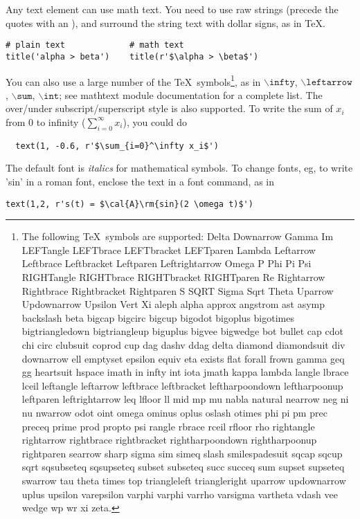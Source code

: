 \documentclass[twoside,10pt]{book}
\begin{document}
Any text element can use math text.  You need to use raw strings
(precede the quotes with an ), and surround the string text
with dollar signs, as in \TeX.
\begin{lstlisting}
# plain text             # math text
title('alpha > beta')    title(r'$\alpha > \beta$')
\end{lstlisting}
You can also use a large number of the \TeX\ symbols\footnote{The following \TeX\ symbols are
supported: {\tiny Delta Downarrow Gamma Im LEFTangle LEFTbrace
  LEFTbracket LEFTparen Lambda Leftarrow Leftbrace Leftbracket
  Leftparen Leftrightarrow Omega P Phi Pi Psi RIGHTangle RIGHTbrace
  RIGHTbracket RIGHTparen Re Rightarrow Rightbrace Rightbracket
  Rightparen S SQRT Sigma Sqrt Theta Uparrow Updownarrow Upsilon Vert
  Xi aleph alpha approx angstrom ast asymp backslash beta bigcap
  bigcirc bigcup bigodot bigoplus bigotimes bigtriangledown
  bigtriangleup biguplus bigvee bigwedge bot bullet cap cdot chi circ
  clubsuit coprod cup dag dashv ddag delta diamond diamondsuit div
  downarrow ell emptyset epsilon equiv eta exists flat forall frown
  gamma geq gg heartsuit hspace imath in infty int iota jmath kappa
  lambda langle lbrace lceil leftangle leftarrow leftbrace leftbracket
  leftharpoondown leftharpoonup leftparen leftrightarrow leq lfloor ll
  mid mp mu nabla natural nearrow neg ni nu nwarrow odot oint omega
  ominus oplus oslash otimes phi pi pm prec preceq prime prod propto
  psi rangle rbrace rceil rfloor rho rightangle rightarrow rightbrace
  rightbracket rightharpoondown rightharpoonup rightparen searrow
  sharp sigma sim simeq slash smilespadesuit sqcap sqcup sqrt
  sqsubseteq sqsupseteq subset subseteq succ succeq sum supset
  supseteq swarrow tau theta times top triangleleft triangleright
  uparrow updownarrow uplus upsilon varepsilon varphi varphi varrho
  varsigma vartheta vdash vee wedge wp wr xi zeta}.}, as in
$\mathtt{\backslash infty}$, $\mathtt{\backslash leftarrow}$,
$\mathtt{\backslash sum}$, $\mathtt{\backslash int}$; see mathtext
module documentation for a complete list.  The over/under
subscript/superscript style is also supported.  To write the sum of
$x_i$ from 0 to infinity ($\sum_{i=0}^\infty x_i$), you could do
\begin{lstlisting}
  text(1, -0.6, r'$\sum_{i=0}^\infty x_i$')
\end{lstlisting}
The default font is \textit{italics} for mathematical symbols.  To
change fonts, eg, to write 'sin' in a \textrm{roman font}, enclose the
text in a font command, as in
\begin{lstlisting}
text(1,2, r's(t) = $\cal{A}\rm{sin}(2 \omega t)$')
\end{lstlisting}
\end{document}
